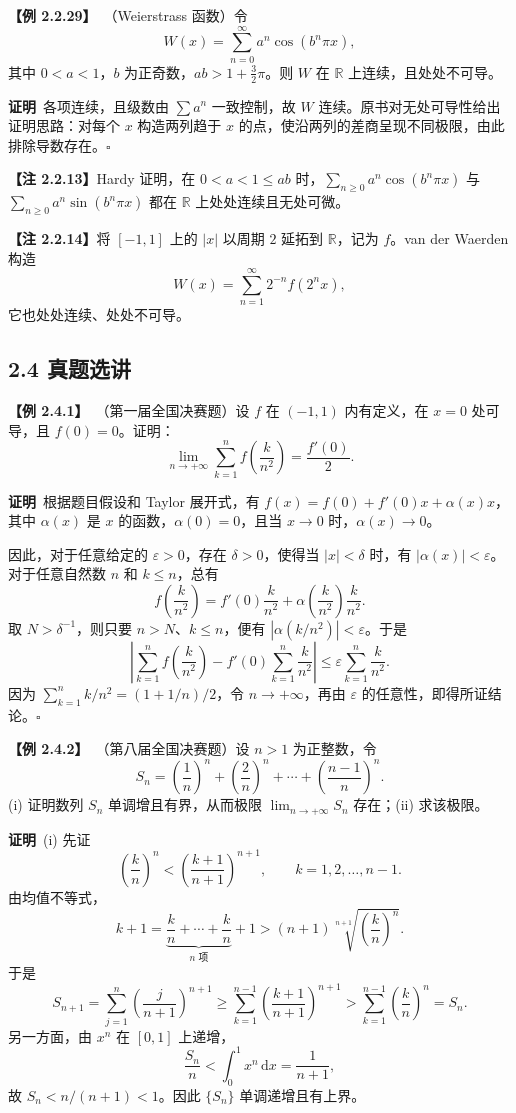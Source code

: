\documentclass[UTF8,a4paper,11pt]{ctexart}
\newcommand{\ex}[1]{\par\medskip\noindent\textbf{【例 #1】}\ }
\newcommand{\pf}{\par\noindent\textbf{证明}\ }
\begin{document}
\ex{2.2.29}（Weierstrass 函数）令
\[
W(x)=\sum_{n=0}^{\infty}a^n\cos(b^n\pi x),
\]
其中 $0<a<1$，$b$ 为正奇数，$ab>1+\tfrac32\pi$。则 $W$ 在 $\mathbb R$ 上连续，且处处不可导。
\pf 各项连续，且级数由 $\sum a^n$ 一致控制，故 $W$ 连续。原书对无处可导性给出证明思路：对每个 $x$ 构造两列趋于 $x$ 的点，使沿两列的差商呈现不同极限，由此排除导数存在。\hfill$\square$

\noindent\textbf{【注 2.2.13】}Hardy 证明，在 $0<a<1\le ab$ 时，$\sum_{n\ge0}a^n\cos(b^n\pi x)$ 与 $\sum_{n\ge0}a^n\sin(b^n\pi x)$ 都在 $\mathbb R$ 上处处连续且无处可微。

\noindent\textbf{【注 2.2.14】}将 $[-1,1]$ 上的 $|x|$ 以周期 $2$ 延拓到 $\mathbb R$，记为 $f$。van der Waerden 构造
\[
W(x)=\sum_{n=1}^{\infty}2^{-n}f(2^nx),
\]
它也处处连续、处处不可导。
\clearpage
\subsection*{2.4 真题选讲}

\ex{2.4.1}（第一届全国决赛题）设 $f$ 在 $(-1,1)$ 内有定义，在 $x=0$ 处可导，且 $f(0)=0$。证明：
\[
\lim_{n\to+\infty}\sum_{k=1}^{n}f\!\left(\frac{k}{n^2}\right)=\frac{f'(0)}{2}.
\]
\pf 根据题目假设和 Taylor 展开式，有 $f(x)=f(0)+f'(0)x+\alpha(x)x$，其中 $\alpha(x)$ 是 $x$ 的函数，$\alpha(0)=0$，且当 $x\to0$ 时，$\alpha(x)\to0$。

因此，对于任意给定的 $\varepsilon>0$，存在 $\delta>0$，使得当 $|x|<\delta$ 时，有 $|\alpha(x)|<\varepsilon$。对于任意自然数 $n$ 和 $k\le n$，总有
\[
f\!\left(\frac{k}{n^2}\right)=f'(0)\frac{k}{n^2}+\alpha\!\left(\frac{k}{n^2}\right)\frac{k}{n^2}.
\]
取 $N>\delta^{-1}$，则只要 $n>N$、$k\le n$，便有 $|\alpha(k/n^2)|<\varepsilon$。于是
\[
\left|\sum_{k=1}^{n}f\!\left(\frac{k}{n^2}\right)-f'(0)\sum_{k=1}^{n}\frac{k}{n^2}\right|
\le\varepsilon\sum_{k=1}^{n}\frac{k}{n^2}.
\]
因为 $\sum_{k=1}^{n}k/n^2=(1+1/n)/2$，令 $n\to+\infty$，再由 $\varepsilon$ 的任意性，即得所证结论。\hfill$\square$

\ex{2.4.2}（第八届全国决赛题）设 $n>1$ 为正整数，令
\[
S_n=\left(\frac1n\right)^n+\left(\frac2n\right)^n+\cdots+\left(\frac{n-1}{n}\right)^n.
\]
(i) 证明数列 $S_n$ 单调增且有界，从而极限 $\lim_{n\to+\infty}S_n$ 存在；(ii) 求该极限。

\pf (i) 先证
\[
\left(\frac{k}{n}\right)^n<\left(\frac{k+1}{n+1}\right)^{n+1},\qquad k=1,2,\ldots,n-1.
\]
由均值不等式，
\[
k+1=\underbrace{\frac{k}{n}+\cdots+\frac{k}{n}}_{n\text{ 项}}+1
>(n+1)\sqrt[n+1]{\left(\frac{k}{n}\right)^n}.
\]
于是
\[
S_{n+1}=\sum_{j=1}^{n}\left(\frac{j}{n+1}\right)^{n+1}
\ge\sum_{k=1}^{n-1}\left(\frac{k+1}{n+1}\right)^{n+1}
>\sum_{k=1}^{n-1}\left(\frac{k}{n}\right)^n=S_n.
\]
另一方面，由 $x^n$ 在 $[0,1]$ 上递增，
\[
\frac{S_n}{n}<\int_0^1 x^n\,\mathrm dx=\frac1{n+1},
\]
故 $S_n<n/(n+1)<1$。因此 $\{S_n\}$ 单调递增且有上界。
\end{document}
